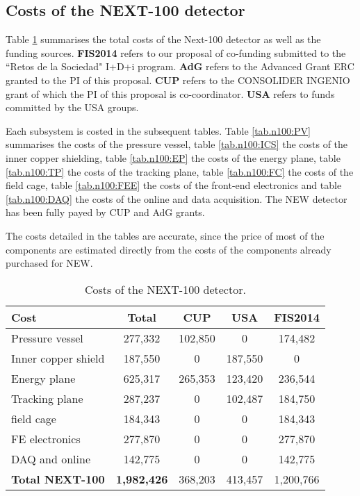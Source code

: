 \subsection{Costs of the NEXT-100 detector}
Table \ref{tab.n100:DET} summarises the total costs of the Next-100 detector as well as the funding sources. {\bf FIS2014} refers to our proposal of co-funding submitted to the ``Retos de la Sociedad" I+D+i program. {\bf AdG} refers to the Advanced Grant ERC granted to the PI of this proposal. {\bf CUP} refers to the CONSOLIDER INGENIO grant of which the PI of this proposal is co-coordinator. {\bf USA} refers to funds committed by the USA groups.

Each subsystem is costed in the subsequent tables. Table \ref{tab.n100:PV} summarises the costs of the pressure vessel, 
table \ref{tab.n100:ICS} the costs of the inner copper shielding,
table \ref{tab.n100:EP} the costs of the energy plane,
table \ref{tab.n100:TP} the costs of the tracking plane,
table \ref{tab.n100:FC} the costs of the field cage,
table \ref{tab.n100:FEE} the costs of the front-end electronics and
table \ref{tab.n100:DAQ} the costs of the online and data acquisition. The NEW detector has
been fully payed by CUP and AdG grants.

The costs detailed in the tables are  accurate, since the price of most of the components are estimated directly from the costs of the components already purchased for NEW. 
  
\begin{table}[h!]
\begin{center}
\begin{tabular}{|l|c|c|c|c|}
\hline
 Cost &	Total& 	CUP & USA & FIS2014 \\
 \hline
Pressure vessel &	277,332 & 102,850  & 0&	174,482  \\
Inner copper shield &	187,550 &	0 & 187,550 & 0 \\
Energy plane	& 625,317 &	265,353	&	123,420	&	236,544 \\
Tracking plane	& 287,237 &	0 & 102,487	& 184,750 \\
field cage	& 184,343 &	0	& 0	&	184,343 \\
FE electronics	& 277,870 &	0 &	0 &	277,870 \\
DAQ and online &	142,775 & 	0	& 0	& 142,775 \\
 \hline
{\bf Total NEXT-100} &	{\bf1,982,426 }& 368,203& 	413,457 & 	1,200,766 \\	
 \hline\hline
\end{tabular}  
\caption{Costs of the NEXT-100 detector.}
\label{tab.n100:DET}
\end{center}
\end{table} 

